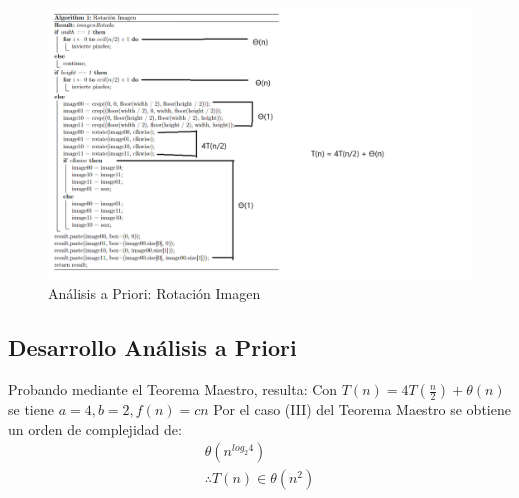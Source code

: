        \begin{figure}[htp!]
            \centering
            \includegraphics[width=1 \textwidth]{Images/A_Priori/priori.png}
            \caption{Análisis a Priori: Rotación Imagen}
            \label{fig:priori}
        \end{figure}

        \subsection{Desarrollo Análisis a Priori}
            Probando mediante el Teorema Maestro, resulta:
            Con \(T(n) = 4T(\frac{n}{2}) + \theta(n)\) se tiene \(a=4, b=2, f(n) = cn\)
            \newline
            Por el caso (III) del Teorema Maestro se obtiene un orden de complejidad de: 
                \begin{gather*}
                    \theta(n^{log_{2}4})\\
                    \therefore T(n)\in \theta(n^{2})
                \end{gather*}
    
    
    \newpage    
